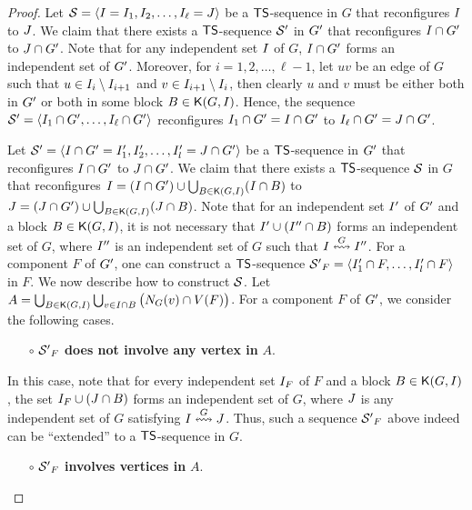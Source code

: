 \documentclass[a4paper]{llncs}
\begin{document}
\begin{proof}

Let ${\cal S} = \langle I = I_1, I_2, \dots, I_\ell = J \rangle$ be a ${\sf TS}$-sequence in $G$ that reconfigures $I$ to $J$.
We claim that there exists a ${\sf TS}$-sequence ${{\cal S}^\prime}$ in ${G^\prime}$ that reconfigures $I \cap {G^\prime}$ to $J \cap {G^\prime}$.
Note that for any independent set $I$ of $G$, $I \cap {G^\prime}$ forms an independent set of ${G^\prime}$.
Moreover, for $i = 1, 2, \dots, \ell - 1$, let $uv$ be an edge of $G$ such that $u \in I_i \setminus I_{i+1}$ and $v \in I_{i+1} \setminus I_i$, then clearly $u$ and $v$ must be either both in ${G^\prime}$ or both in some block $B \in {\mathsf K}{(G, I)}$.
Hence, the sequence ${{\cal S}^\prime} = \langle I_1 \cap {G^\prime}, \dots, I_\ell \cap {G^\prime} \rangle$ reconfigures $I_1 \cap {G^\prime} = I \cap {G^\prime}$ to $I_\ell \cap {G^\prime} = J \cap {G^\prime}$.

Let ${{\cal S}^\prime} = \langle I \cap {G^\prime} = I^{\prime}_1, I^{\prime}_2, \dots, I^{\prime}_l = J \cap {G^\prime} \rangle$ be a ${\sf TS}$-sequence in ${G^\prime}$ that reconfigures $I \cap {G^\prime}$ to $J \cap {G^\prime}$.
We claim that there exists a ${\sf TS}$-sequence ${\cal S}$ in $G$ that reconfigures $I = (I \cap {G^\prime}) \cup \bigcup_{B \in {\mathsf K}{(G, I)}}(I \cap B)$ to $J = (J \cap {G^\prime}) \cup \bigcup_{B \in {\mathsf K}{(G, I)}}(J \cap B)$.
Note that for an independent set $I^{\prime}$ of ${G^\prime}$ and a block $B \in {\mathsf K}{(G, I)}$, it is not necessary that $I^{\prime} \cup (I^{\prime\prime} \cap B)$ forms an independent set of $G$,
	where $I^{\prime\prime}$ is an independent set of $G$ such that $I \overset{G}{\leftrightsquigarrow} I^{\prime\prime}$.
For a component $F$ of ${G^\prime}$, one can construct a ${\sf TS}$-sequence ${{\cal S}^\prime}_F = \langle I^{\prime}_1 \cap F, \dots, I^{\prime}_l \cap F \rangle$ in $F$. 
We now describe how to construct ${\cal S}$.
Let $A = \bigcup_{B \in {\mathsf K}{(G, I)}}\bigcup_{v \in I \cap B}\big( N_{G}(v) \cap V(F) \big)$.
For a component $F$ of ${G^\prime}$, we consider the following cases.

\begin{itemize}
\item [$\circ$] ${{\cal S}^\prime}_F$ \textbf{does not involve any vertex in} $A$.
\end{itemize}

\noindent
In this case, note that for every independent set $I_F$ of $F$ and a block $B \in {\mathsf K}{(G, I)}$, the set $I_F \cup (J \cap B)$ forms an independent set of $G$, where $J$ is any independent set of $G$ satisfying $I \overset{G}{\leftrightsquigarrow} J$.
Thus, such a sequence ${{\cal S}^\prime}_F$ above indeed can be ``extended'' to a ${\sf TS}$-sequence in $G$.
\begin{itemize}
\item [$\circ$] ${{\cal S}^\prime}_F$ \textbf{involves vertices in} $A$.
\end{itemize}


\end{proof}
\end{document}
